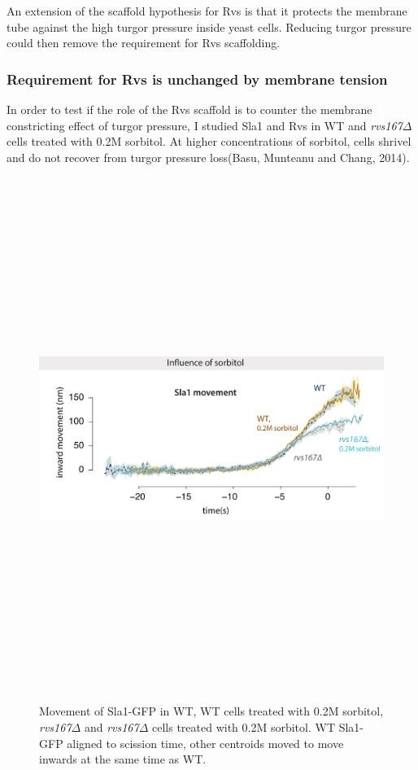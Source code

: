An extension of the scaffold hypothesis for Rvs is that it protects the membrane tube against the high turgor pressure inside yeast cells. Reducing turgor pressure could then remove the requirement for Rvs scaffolding.

	\subsubsection{Requirement for Rvs is unchanged by membrane tension}

	In order to test if the role of the Rvs scaffold is to counter the membrane constricting effect of turgor pressure, I studied Sla1 and Rvs in WT and \textit{rvs167$\Delta$} cells treated with 0.2M sorbitol. At higher concentrations of sorbitol, cells shrivel and do not recover from turgor pressure loss(Basu, Munteanu and Chang, 2014).

	
		\begin{figure}[H]
		\centering
		\includegraphics[width=15cm,height=17cm,keepaspectratio]{figures/results_final/sorbitol2}
		\caption[Effect of sorbitol on \textit{rvs167$\Delta$} cells]
		{Movement of Sla1-GFP in WT, WT cells treated with 0.2M sorbitol, \textit{rvs167$\Delta$} and \textit{rvs167$\Delta$} cells treated with 0.2M sorbitol. WT Sla1-GFP aligned to scission time, other centroids moved to move inwards at the same time as WT.
			\label{fig_sorbitol}}
		
	\end{figure}

